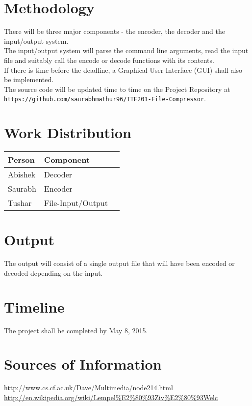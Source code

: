 \documentclass[12pt, a4paper]{article}
\begin{document}
    \section*{Methodology}
    There will be three major components - the encoder, the decoder and the input/output system. \\The input/output system will parse the command line arguments, read the input file and suitably call the encode or decode functions with its contents. \\If there is time before the deadline, a Graphical User Interface (GUI) shall also be implemented.  \\
    The source code will be updated time to time on the Project Repository at \texttt{\small{https://github.com/saurabhmathur96/ITE201-File-Compressor}}.
    \section*{Work Distribution}
        \begin{tabular}{llr}
        \toprule
        \cmidrule(r){1-2}
        Person    & Component \\
        \midrule
        Abishek      & Decoder  \\
        Saurabh   & Encoder       \\
        Tushar       & File-Input/Output     \\
        \bottomrule
        \end{tabular}
    \section*{Output}
    The output will consist of a single output file that will have been encoded or decoded depending on the input.
    \section*{Timeline}
    The project shall be completed by May 8, 2015.
    \section*{Sources of Information}
    \url{http://www.cs.cf.ac.uk/Dave/Multimedia/node214.html}\\
    \url{http://en.wikipedia.org/wiki/Lempel%E2%80%93Ziv%E2%80%93Welc}
\end{document}

